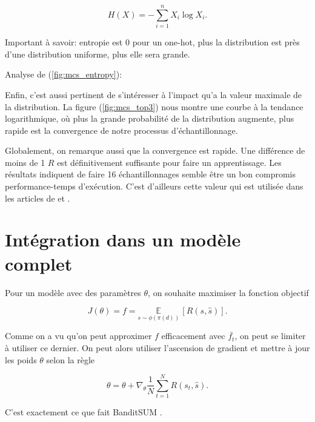 \begin{equation*}
    H(X) = - \sum_{i=1}^n X_i \log X_i.
\end{equation*}

Important à savoir: entropie est 0 pour un one-hot, plus la distribution est près
d'une distribution uniforme, plus elle sera grande.

Analyse de (\ref{fig:mcs_entropy}): 

Enfin, c'est aussi pertinent de s'intéresser à l'impact qu'a la valeur maximale de
la distribution.
La figure (\ref{fig:mcs_top3}) nous montre une courbe à la tendance logarithmique,
où plus la grande probabilité de la distribution augmente, plus rapide est la convergence
de notre processus d'échantillonnage.

Globalement, on remarque aussi que la convergence est rapide.
Une différence de moins de 1 $R$ est définitivement suffisante pour faire un
apprentissage.
Les résultats indiquent de faire 16 échantillonnages semble être un bon compromis
performance-temps d'exécution.
C'est d'ailleurs cette valeur qui est utilisée dans les articles de \citep{dong2018banditsum}
et \citep{luo-etal-2019-reading}.

\section{Intégration dans un modèle complet}

Pour un modèle avec des paramètres $\theta$, on souhaite maximiser
la fonction objectif

\begin{equation}
    J(\theta) = f = \underset{{s \sim \phi(\pi(d))}}{\mathbb{E}} \,\left[R(s, \hat{s})\right].
\end{equation}

Comme on a vu qu'on peut approximer $f$ efficacement avec $\bar{f_t}$, on peut se limiter
à utiliser ce dernier.
On peut alors utiliser l'ascension de gradient et mettre à jour les poids $\theta$
selon la règle

\begin{equation*}
    \theta = \theta + \nabla_\theta \frac{1}{N} \sum_{t=1}^N R(s_t, \hat{s}).
\end{equation*}

C'est exactement ce que fait BanditSUM \citep{dong2018banditsum}.

